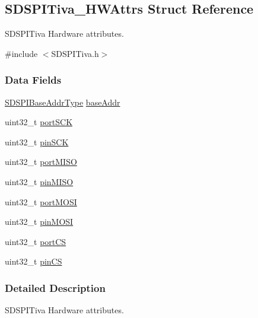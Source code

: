 \subsection{S\-D\-S\-P\-I\-Tiva\-\_\-\-H\-W\-Attrs Struct Reference}
\label{struct_s_d_s_p_i_tiva___h_w_attrs}


S\-D\-S\-P\-I\-Tiva Hardware attributes.  




{\ttfamily \#include $<$S\-D\-S\-P\-I\-Tiva.\-h$>$}

\subsubsection*{Data Fields}
\begin{DoxyCompactItemize}
\item 
\hyperlink{_s_d_s_p_i_c_c3200_8h_ad2ee2f6fbdb79c0577161ae92a7f1650}{S\-D\-S\-P\-I\-Base\-Addr\-Type} \hyperlink{struct_s_d_s_p_i_tiva___h_w_attrs_a4e51479529ad50f9ecb38b73b7f12178}{base\-Addr}
\item 
uint32\-\_\-t \hyperlink{struct_s_d_s_p_i_tiva___h_w_attrs_ada428b116f5c2ff434bc8b42fe3fce67}{port\-S\-C\-K}
\item 
uint32\-\_\-t \hyperlink{struct_s_d_s_p_i_tiva___h_w_attrs_a669a419841ff7c5ba81778ed94488f25}{pin\-S\-C\-K}
\item 
uint32\-\_\-t \hyperlink{struct_s_d_s_p_i_tiva___h_w_attrs_a5586b260f63484ba6a17e17df3b55cd8}{port\-M\-I\-S\-O}
\item 
uint32\-\_\-t \hyperlink{struct_s_d_s_p_i_tiva___h_w_attrs_a4f9e453efc436b6085d60958c4e35621}{pin\-M\-I\-S\-O}
\item 
uint32\-\_\-t \hyperlink{struct_s_d_s_p_i_tiva___h_w_attrs_ab3777b1b021adab95b084a184c52190c}{port\-M\-O\-S\-I}
\item 
uint32\-\_\-t \hyperlink{struct_s_d_s_p_i_tiva___h_w_attrs_a9cd1616a8428a2a12986a77d43b74870}{pin\-M\-O\-S\-I}
\item 
uint32\-\_\-t \hyperlink{struct_s_d_s_p_i_tiva___h_w_attrs_a280c343673240705674b67fd32c4affc}{port\-C\-S}
\item 
uint32\-\_\-t \hyperlink{struct_s_d_s_p_i_tiva___h_w_attrs_a50cd7f2bd849a73e055283d3a302f3fe}{pin\-C\-S}
\end{DoxyCompactItemize}


\subsubsection{Detailed Description}
S\-D\-S\-P\-I\-Tiva Hardware attributes. 

